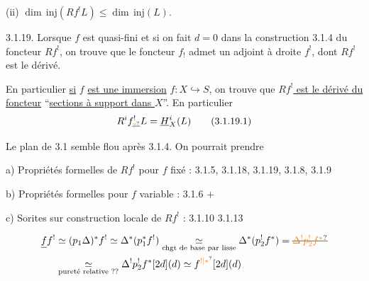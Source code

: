 (ii) $\dim\mathrm{\,inj}(Rf^!L)\leq\dim\mathrm{\,inj}(L)$.

3.1.19. Lorsque $f$ est quasi-fini et si on fait $d=0$ dans la construction 3.1.4 du foncteur $Rf^!$, on trouve  que le foncteur $f_!$ admet un adjoint à droite $f^!$, dont $Rf^!$ est le dérivé.

En particulier \uline{si} $f$ \uline{est une immersion} $f:X\hookrightarrow S$, on trouve que \uline{$Rf^!$ est le dérivé du foncteur} ``\uline{sections à support dans $X$}''. En particulier
\[
 R^if^!_{\deleted{\unsure{?}}}L=\underline H_X^i(L)
 \tag*{(3.1.19.1)}
\]

Le plan de 3.1 semble flou après 3.1.4. On pourrait prendre

a) Propriétés formelles de $Rf^!$ pour $f$ fixé :  3.1.5, 3.1.18, 3.1.19, 3.1.8, 3.1.9

b) Propriétés formelles pour $f$ variable : 3.1.6 $+$ 

c) Sorites sur construction locale de $Rf^!$ : 3.1.10  3.1.13

\[
 \begin{aligned}
 \deleted{f}f^!&\simeq(p_1\Delta)^*f^!\simeq\Delta^*(p_1^*f^!)
 \underset{\text{chgt de base par lisse}}{\simeq}\Delta^*(p_2^!f^*)=\deleted{\unsure{\Delta^!p_2^!f^*}}\\
 &\underset{\text{pureté relative ??}}{\simeq}\Delta^!p_2^!f^*[2d](d)\simeq f^{\unsure{!|*}}[2d](d)
 \end{aligned}
\]
